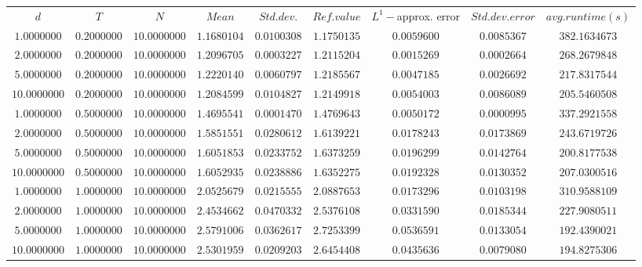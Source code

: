 \begin{tabular}{ccccccccc}
$d$ & $T$ & $N$ & $Mean$ & $Std. dev.$ & $Ref. value$ & $L^1-$approx. error & $Std. dev. error$ & $avg. runtime (s)$\\
$1.0000000$ & $0.2000000$ & $10.0000000$ & $1.1680104$ & $0.0100308$ & $1.1750135$ & $0.0059600$ & $0.0085367$ & $382.1634673$\\
$2.0000000$ & $0.2000000$ & $10.0000000$ & $1.2096705$ & $0.0003227$ & $1.2115204$ & $0.0015269$ & $0.0002664$ & $268.2679848$\\
$5.0000000$ & $0.2000000$ & $10.0000000$ & $1.2220140$ & $0.0060797$ & $1.2185567$ & $0.0047185$ & $0.0026692$ & $217.8317544$\\
$10.0000000$ & $0.2000000$ & $10.0000000$ & $1.2084599$ & $0.0104827$ & $1.2149918$ & $0.0054003$ & $0.0086089$ & $205.5460508$\\
$1.0000000$ & $0.5000000$ & $10.0000000$ & $1.4695541$ & $0.0001470$ & $1.4769643$ & $0.0050172$ & $0.0000995$ & $337.2921558$\\
$2.0000000$ & $0.5000000$ & $10.0000000$ & $1.5851551$ & $0.0280612$ & $1.6139221$ & $0.0178243$ & $0.0173869$ & $243.6719726$\\
$5.0000000$ & $0.5000000$ & $10.0000000$ & $1.6051853$ & $0.0233752$ & $1.6373259$ & $0.0196299$ & $0.0142764$ & $200.8177538$\\
$10.0000000$ & $0.5000000$ & $10.0000000$ & $1.6052935$ & $0.0238886$ & $1.6352275$ & $0.0192328$ & $0.0130352$ & $207.0300516$\\
$1.0000000$ & $1.0000000$ & $10.0000000$ & $2.0525679$ & $0.0215555$ & $2.0887653$ & $0.0173296$ & $0.0103198$ & $310.9588109$\\
$2.0000000$ & $1.0000000$ & $10.0000000$ & $2.4534662$ & $0.0470332$ & $2.5376108$ & $0.0331590$ & $0.0185344$ & $227.9080511$\\
$5.0000000$ & $1.0000000$ & $10.0000000$ & $2.5791006$ & $0.0362617$ & $2.7253399$ & $0.0536591$ & $0.0133054$ & $192.4390021$\\
$10.0000000$ & $1.0000000$ & $10.0000000$ & $2.5301959$ & $0.0209203$ & $2.6454408$ & $0.0435636$ & $0.0079080$ & $194.8275306$\\
\end{tabular}
